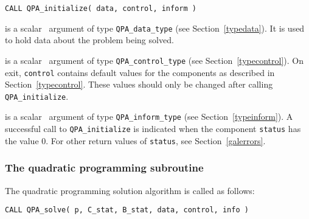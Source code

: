 \documentclass{galahad}
\newcommand{\packagename}{QPA}
\begin{document}
\hspace{8mm}
{\tt CALL \packagename\_initialize( data, control, inform )}

\vspace*{-3mm}
\begin{description}

 is a scalar \intentinout\ argument of type 
{\tt \packagename\_data\_type}
(see Section~\ref{typedata}). It is used to hold data about the problem being 
solved. 

 is a scalar \intentout\ argument of type 
{\tt \packagename\_control\_type}
(see Section~\ref{typecontrol}). 
On exit, {\tt control} contains default values for the components as
described in Section~\ref{typecontrol}.
These values should only be changed after calling 
{\tt \packagename\_initialize}.

 is a scalar \intentinout\ argument of type 
{\tt \packagename\_inform\_type}
(see Section~\ref{typeinform}). A successful call to
{\tt \packagename\_initialize}
is indicated when the  component {\tt status} has the value 0. 
For other return values of {\tt status}, see Section~\ref{galerrors}.

\end{description}


\subsubsection{The quadratic programming subroutine}\label{qps}
The quadratic programming solution algorithm is called as follows:
\vspace*{1mm}

\hspace{8mm}
{\tt CALL \packagename\_solve( p, C\_stat, B\_stat, data, control, info )}
\end{document}
